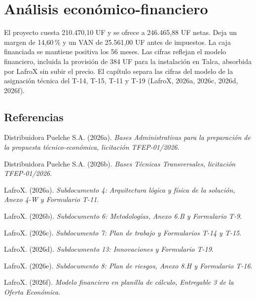 \chapter{Análisis económico-financiero}
\label{cap:e2}

El proyecto cuesta 210.470,10 UF y se ofrece a 246.465,88 UF netas. Deja un margen de 14,60\,\% y un VAN de 25.561,00 UF antes de impuestos. La caja financiada se mantiene positiva los 56 meses. Las cifras reflejan el modelo financiero, incluida la provisión de 384 UF para la instalación en Talca, absorbida por LafroX sin subir el precio. El capítulo separa las cifras del modelo de la asignación técnica del T-14, T-15, T-11 y T-19 (LafroX, 2026a, 2026c, 2026d, 2026f).


\section*{Referencias}
{}

\noindent Distribuidora Puelche S.A. (2026a). \textit{Bases Administrativas para la preparación de la propuesta técnico-económica, licitación TFEP-01/2026}.

\noindent Distribuidora Puelche S.A. (2026b). \textit{Bases Técnicas Transversales, licitación TFEP-01/2026}.

\noindent LafroX. (2026a). \textit{Subdocumento 4: Arquitectura lógica y física de la solución, Anexo 4-W y Formulario T-11}.

\noindent LafroX. (2026b). \textit{Subdocumento 6: Metodologías, Anexo 6.B y Formulario T-9}.

\noindent LafroX. (2026c). \textit{Subdocumento 7: Plan de trabajo y Formularios T-14 y T-15}.

\noindent LafroX. (2026d). \textit{Subdocumento 13: Innovaciones y Formulario T-19}.

\noindent LafroX. (2026e). \textit{Subdocumento 8: Plan de riesgos, Anexo 8.H y Formulario T-16}.

\noindent LafroX. (2026f). \textit{Modelo financiero en planilla de cálculo, Entregable 3 de la Oferta Económica}.

